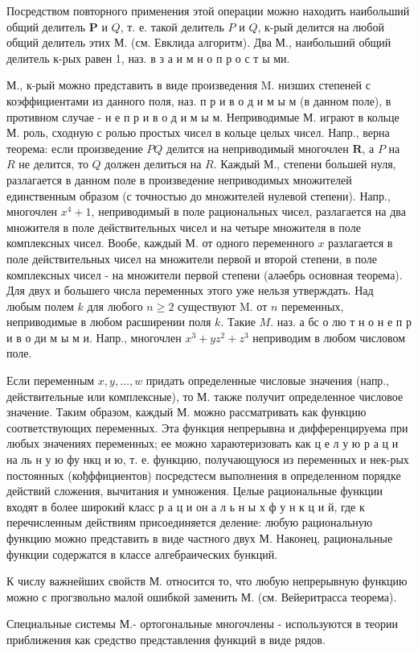 \documentclass[10pt]{article}
\begin{document}
Посредством повторного применения этой операции можно находить наибольший общий делитель $\boldsymbol{P}$ и $Q$, т. е. такой делитель $P$ и $Q$, к-рый делится на любой общий делитель этих М. (см. Евклида алгоритм). Два М., наибольший общий делитель к-рых равен 1, наз. в з а и м н о п р о с т ы ми.



М., к-рый можно представить в виде произведения M. низших степеней с коэффициентами из данного поля, наз. п р и в о д и м ы м (в данном поле), в противном случае - н е п р и в о д и м ы м. Неприводимые М. играют в кольце М. роль, сходную с ролью простых чисел в кольце целых чисел. Напр., верна теорема: если произведение $P Q$ делится на неприводимый многочлен $\boldsymbol{R}$, а $P$ на $R$ не делится, то $Q$ должен делиться на $R$. Каждый М., степени большей нуля, разлагается в данном поле в произведение неприводимых множителей единственным образом (с точностью до множителей нулевой степени). Напр., многочлен $x^{4}+1$, неприводимый в поле рациональных чисел, разлагается на два множителя в поле действительных чисел и на четыре множителя в поле комплексных чисел. Вообе, каждый М. от одного переменного $x$ разлагается в поле действительных чисел на множители первой и второй степени, в поле комплексных чисел - на множители первой степени (аләебрь основная теорема). Для двух и большего числа переменных этого уже нельзя утверждать. Над любым полем $k$ для любого $n \geqslant 2$ существуют M. от $n$ переменных, неприводимые в любом расширении поля $k$. Такие $M$. наз. а бс о лю т н о н е п р и в о ди м ы м и. Напр., многочлен $x^{3}+y z^{2}+z^{3}$ неприводим в любом числовом поле.



Если переменным $x, y, \ldots, w$ придать определенные числовые значения (напр., действительные или комплексные), то М. также получит определенное числовое значение. Таким образом, каждый М. можно рассматривать как функцию соответствующих переменных. Эта функция непрерывна и дифференцируема при любых значениях переменных; ее можно хараютеризовать как ц е л у ю р а ц и на ль н у ю фу нкц и ю, т. е. функцию, получающуюся из переменных и нек-рых постоянных (кођффициентов) посредстесм выполнения в определенном порядке действий сложения, вычитания и умножения. Целые рациональные функции входят в более широкий класс р а ц и он а л ь н ы х ф у н к ц и й, где к перечисленным действиям присоединяется деление: любую рациональную функцию можно представить в виде частного двух М. Наконец, рациональные функции содержатся в классе алгебраических бункций.



К числу важнейших свойств М. относится то, что любую непрерывную функцию можно с прогзвольно малой ошибкой заменить М. (см. Вейеритрасса теорема).



Специальные системы М.- ортогональные многочлены - используются в теории приближения как средство представления функций в виде рядов.
\end{document}
